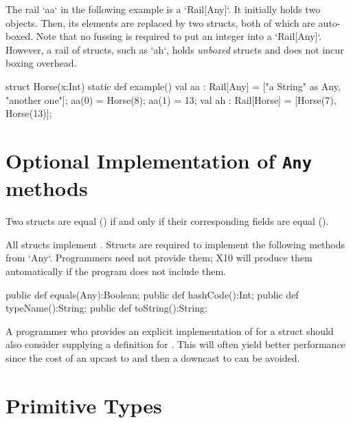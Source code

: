 \begin{ex}
The rail \xcd`aa` in the following example is a \xcd`Rail[Any]`.  It
initially holds two objects.  Then, its elements are replaced by two structs,
both of which are auto-boxed.  Note that no fussing is required to put an
integer into a \xcd`Rail[Any]`.  
However, a rail of structs, such as \xcd`ah`, holds {\em unboxed} structs
and does not incur boxing overhead.
\begin{xten}
struct Horse(x:Int){
  static def example(){
    val aa : Rail[Any] = ["a String" as Any, "another one"];
    aa(0) = Horse(8);
    aa(1) = 13;
    val ah : Rail[Horse] = [Horse(7), Horse(13)];
  }
}
\end{xten}
%


\end{ex}

\section{Optional Implementation of {\tt Any} methods}
\label{StructAnyMethods}

Two
structs are equal (\Xcd{==}) if and only if their corresponding fields
are equal (\Xcd{==}). 

All structs implement . 
Structs are required to implement the following methods from \xcd`Any`.  
Programmers need not provide them; X10 will produce them automatically if 
the program does not include them. 
\begin{xten}
  public def equals(Any):Boolean;
  public def hashCode():Int;
  public def typeName():String;
  public def toString():String;  
\end{xten}


A programmer who provides an explicit implementation
of  for a struct  should also consider
supplying a definition for . This will often
yield better performance since the cost of an upcast to  and
then a downcast to  can be avoided.

\section{Primitive Types}

